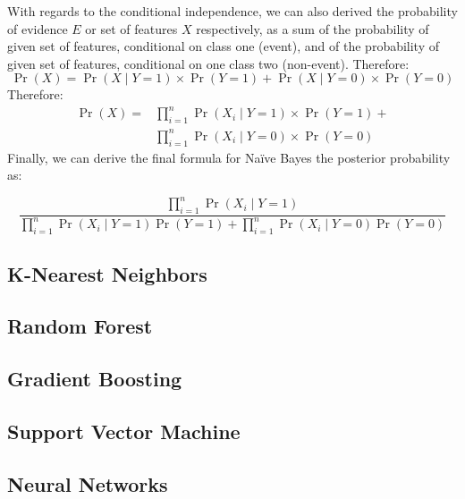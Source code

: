 With regards to the conditional independence, we can also derived the probability of evidence $E$ or set of features $X$ respectively, as a sum of the probability of given set of features, conditional on class one (event), and of the probability of given set of features, conditional on one class two (non-event).
Therefore:
\begin{equation}\label{eq}
\operatorname{Pr}\left(X\right) = \operatorname{Pr}\left(X \mid Y=1\right) \times \operatorname{Pr}\left(Y=1\right) + \operatorname{Pr}\left(X \mid Y=0\right) \times \operatorname{Pr}\left(Y=0\right)
\end{equation}
Therefore:
\begin{equation}\label{eq}
    \begin{aligned}
    \operatorname{Pr}\left(X\right) = {} & \prod_{i=1}^{n} \operatorname{Pr}\left(X_i \mid Y=1\right) \times \operatorname{Pr}\left(Y=1\right) + \\
    & \prod_{i=1}^{n} \operatorname{Pr}\left(X_i \mid Y=0\right) \times \operatorname{Pr}\left(Y=0\right)
    \end{aligned}
    \end{equation}
Finally, we can derive the final formula for Naïve Bayes the posterior probability as:

    \begin{equation}
        \frac{\displaystyle\prod_{i=1}^{n} \operatorname{Pr}(X_i \mid Y=1)}{\displaystyle\prod_{i=1}^{n} \operatorname{Pr}(X_i \mid Y=1) \operatorname{Pr}(Y=1) + \displaystyle\prod_{i=1}^{n} \operatorname{Pr}(X_i \mid Y=0) \operatorname{Pr}(Y=0)}
        \end{equation}


\subsection{K-Nearest Neighbors}
\subsection{Random Forest}
\subsection{Gradient Boosting}
\subsection{Support Vector Machine}
\subsection{Neural Networks}

